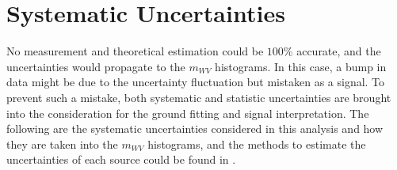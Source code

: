 \section{Systematic Uncertainties}
No measurement and theoretical estimation could be $100\%$ accurate, and the uncertainties would propagate to the $m_{WV}$ histograms. In this case, a bump in data might be due to the uncertainty fluctuation but mistaken as a signal. To prevent such a mistake, both systematic and statistic uncertainties are brought into the consideration for the ground fitting and signal interpretation. The following are the systematic uncertainties considered in this analysis and how they are taken into the $m_{WV}$ histograms, and the methods to estimate the uncertainties of each source could be found in \cite{PERF-2016-01,ATL-PHYS-PUB-2015-037,ATLAS:2019pzw,PERF-2016-04,ATLAS-CONF-2014-018,Herde:2059849}.
